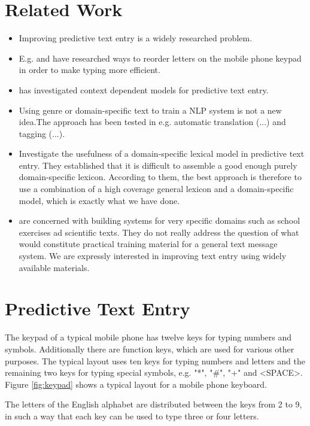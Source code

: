 \documentclass[a4paper,conference]{IEEEtran}
\begin{document}
\section{Related Work}
\label{sec:related-work}

\begin{itemize}
\item Improving predictive text entry is a widely researched problem.
\item E.g. \cite{how05optimizing} and
  \cite{Department98aprobabilistic} have researched ways to reorder
  letters on the mobile phone keypad in order to make typing more
  efficient.
\item \cite{ganslandt/2009} has investigated context dependent models for predictive text entry.
\item Using genre or domain-specific text to train a NLP system is not
  a new idea.The approach has been tested in e.g. automatic
  translation (...) and tagging (...).
\item \cite{Harbusch/2003} Investigate the usefulness of a
  domain-specific lexical model in predictive text entry. They
  established that it is difficult to assemble a good enough purely
  domain-specific lexicon. According to them, the best approach is
  therefore to use a combination of a high coverage general lexicon
  and a domain-specific model, which is exactly what we have done.
\item \cite{Harbusch/2003} are concerned with building systems for very
  specific domains such as school exercises ad scientific texts. They
  do not really address the question of what would constitute
  practical training material for a general text message system. We
  are expressly interested in improving text entry using widely
  available materials.
\end{itemize}

\section{Predictive Text Entry}

The keypad of a typical mobile phone has twelve keys for typing
numbers and symbols. Additionally there are function keys, which are
used for various other purposes. The typical layout uses ten keys for
typing numbers and letters and the remaining two keys for typing
special symbols, e.g. "*", "\#", "+" and <SPACE>. Figure
\ref{fig:keypad} shows a typical layout for a mobile phone keyboard.

The letters of the English alphabet are distributed between the keys
from 2 to 9, in such a way that each key can be used to type three or
four letters.
\end{document}
